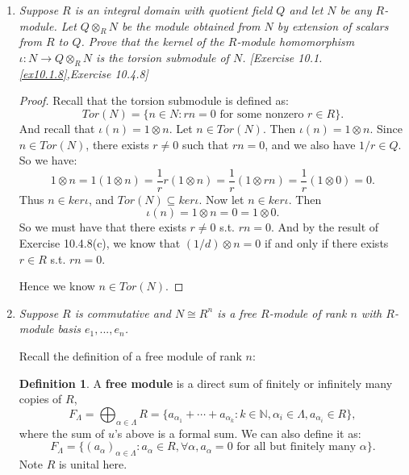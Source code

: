 \documentclass[9pt,reqno,twoside]{amsbook}
\theoremstyle{plain}
\numberwithin{section}{chapter}
\numberwithin{equation}{chapter}
\theoremstyle{definition}
\newtheorem{Def}[theorem]{Definition}
\theoremstyle{remark}
\theoremstyle{plain}
\newcommand{\sub}{\subseteq}
\newcommand{\n}{\mathbb{N}}
\newcommand{\fracc}{\frac}
\newcommand{\tens}{\otimes}
\begin{document}
\begin{enumerate}[label=\arabic*.]
\begin{enumerate}
\end{enumerate}








\item \textit{Suppose $R$ is an integral domain with quotient field $Q$ and let $N$ be any $R$-module. Let $Q \tens_R N$ be the module obtained from $N$ by extension of scalars from $R$ to $Q$. Prove that the kernel of the $R$-module homomorphism $\iota: N \to Q \tens_R N$ is the torsion submodule of $N$. [Exercise 10.1.\ref{ex10.1.8},Exercise 10.4.8]}

\begin{proof}
Recall that the torsion submodule is defined as: 
$$
Tor(N) = \{n \in N:rn = 0 \text{ for some nonzero } r \in R\}. 
$$
And recall that $\iota(n) = 1 \tens n$. Let $n \in Tor(N)$. Then $\iota(n) = 1 \tens n$. Since $n \in Tor(N)$, there exists $r \neq 0$ such that $rn = 0$, and we also have $1/r \in Q$. So we have: 
$$
1 \tens n = 1(1 \tens n) = \fracc{1}{r}r(1 \tens n) = \frac{1}{r}(1 \tens rn) = \fracc{1}{r}(1 \tens 0) = 0.
$$
Thus $n \in ker\iota$, and $Tor(N) \sub ker \iota$. Now let $n \in ker\iota$. Then
$$
\iota(n) = 1 \tens n = 0 = 1 \tens 0. 
$$ 
So we must have that there exists $r \neq 0$ s.t. $rn = 0$. And by the result of Exercise 10.4.8(c), we know that $(1/d) \tens n = 0$ if and only if there exists $r \in R$ s.t. $rn = 0$. 
\begin{comment} Then we would have:
$$
1 \tens n = \fracc{1}{r}r \tens n = \fracc{1}{r}\tens rn = \fracc{1}{r}\tens 0 = 0 = 1 \tens 0.
$$
\end{comment}
Hence we know $n \in Tor(N)$. 
\end{proof}

\item \textit{Suppose $R$ is commutative and $N \cong R^n$ is a free $R$-module of rank $n$ with $R$-module basis $e_1,...,e_n$. }

Recall the definition of a free module of rank $n$: 
\begin{Def}
A \textbf{free module} is a direct sum of finitely or infinitely many copies of $R$, 
$$
F_\Lambda = \bigoplus_{\alpha \in \Lambda}R = \{a_{\alpha_1} + \cdots + a_{\alpha_k}: k \in \n,\alpha_i \in \Lambda,a_{\alpha_i} \in R\},
$$
where the sum of $u$'s above is a formal sum. We can also define it as: 
$$
F_\Lambda = \{(a_\alpha)_{\alpha \in \Lambda}: a_\alpha \in R,\forall \alpha,a_\alpha = 0 \text{ for all but finitely many }\alpha\}.
$$
Note $R$ is unital here. 
\end{Def}


\end{enumerate}
\end{document}
